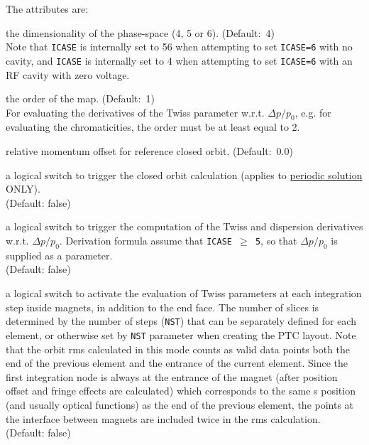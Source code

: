 The attributes are: 
\begin{madlist}

  the dimensionality of the phase-space (4, 5 or
  6). (Default:~4)\\ Note that \texttt{ICASE} is internally set to 56 when
  attempting to set \texttt{ICASE=6} with no cavity, and \texttt{ICASE} is
  internally set to 4 when attempting to set \texttt{ICASE=6} with an RF
  cavity with zero voltage.

  the order of the map. (Default:~1)\\ For evaluating the
  derivatives of the Twiss parameter w.r.t. $\Delta p/p_0$, e.g. for
  evaluating the chromaticities, the order must be at least equal to 2.

  relative momentum offset for reference closed orbit. (Default:~0.0) 

  a logical switch to trigger the closed orbit calculation
  (applies to \hyperref[sec:ptc-twiss-periodic]{periodic solution} ONLY). \\  
  (Default: false)

  a logical switch to trigger the computation of the Twiss and
  dispersion derivatives w.r.t. $\Delta p/p_0$. Derivation formula assume that
  \texttt{ICASE $\ge$ 5}, so that $\Delta p/p_0$ is supplied as a parameter. \\
  (Default: false)

  a logical switch to activate the evaluation of Twiss parameters at each
  integration step inside magnets, in addition to the end face.  The
  number of slices is determined by the number of steps (\texttt{NST}) that
  can be separately defined for each element, or otherwise set by
  \texttt{NST} parameter when creating the PTC layout.  Note that the
  orbit  rms calculated in this mode counts as valid data points both
  the end of the previous element and the entrance of the current
  element. Since the first integration node is always at the entrance of
  the magnet (after position offset and fringe effects are calculated)
  which corresponds to the same s position (and usually optical
  functions) as the end of the previous element, the points at the
  interface between magnets are included twice in the rms calculation. \\ 
  (Default: false)


\end{madlist}
